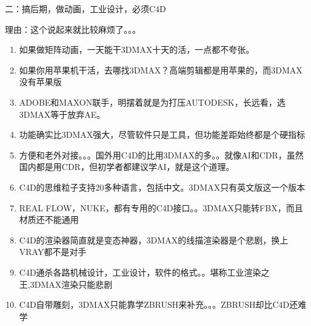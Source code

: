 \documentclass[letterpaper,12pt,english]{sphinxmanual}
\begin{document}
二：搞后期，做动画，工业设计，必须C4D

理由：这个说起来就比较麻烦了。。。
\begin{enumerate}
%
\item {} 
如果做矩阵动画，一天能干3DMAX十天的活，一点都不夸张。

\item {} 
如果你用苹果机干活，去哪找3DMAX？高端剪辑都是用苹果的，而3DMAX没有苹果版

\item {} 
ADOBE和MAXON联手，明摆着就是为打压AUTODESK，长远看，选3DMAX等于放弃AE。

\item {} 
功能确实比3DMAX强大，尽管软件只是工具，但功能差距始终都是个硬指标

\item {} 
方便和老外对接。。。国外用C4D的比用3DMAX的多。。就像AI和CDR，虽然国内都是用CDR，但初学者都建议学AI，就是这个道理。

\item {} 
C4D的思维粒子支持20多种语言，包括中文。3DMAX只有英文版这一个版本

\item {} 
REAL FLOW，NUKE，都有专用的C4D接口。。3DMAX只能转FBX，而且材质还不能通用

\item {} 
C4D的渲染器简直就是变态神器，3DMAX的线描渲染器是个悲剧，换上VRAY都不是对手

\item {} 
C4D通杀各路机械设计，工业设计，软件的格式。。堪称工业渲染之王,3DMAX渲染只能悲剧

\item {} 
C4D自带雕刻，3DMAX只能靠学ZBRUSH来补充。。。ZBRUSH却比C4D还难学

\end{enumerate}
\end{document}
